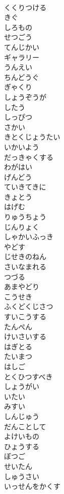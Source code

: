 \documentclass[8pt]{extreport}
\begin{document}
\begin{CJK}{UTF8}{min}
\\	くくりつける
\\	きぐ
\\	しろもの
\\	せつごう
\\	てんじかい
\\	ギャラリー
\\	うんえい
\\	ちんどうぐ
\\	ぎゃくり
\\	しょうぞうが
\\	したう
\\	しっぴつ
\\	さかい
\\	きとくじょうたい
\\	いかいよう
\\	だっきゃくする
\\	わがはい
\\	げんどう
\\	ていきてきに
\\	きょとう
\\	はげむ
\\	りゅうちょう
\\	じんりょく
\\	しゃかいふっき
\\	やどす
\\	じせきのねん
\\	さいなまれる
\\	つづる
\\	あまやどり
\\	こうせき
\\	ふくどくじさつ
\\	すいこうする
\\	たんぺん
\\	けいさいする
\\	はぎとる
\\	たいまつ
\\	はしご
\\	とくひつすべき
\\	しょうがい
\\	いたい
\\	みすい
\\	しんじゅう
\\	だんことして
\\	よけいもの
\\	ひょうする
\\	ぼつご
\\	せいたん
\\	しゅうさい
\\	いっせんをかくす

\end{CJK}
\end{document}
